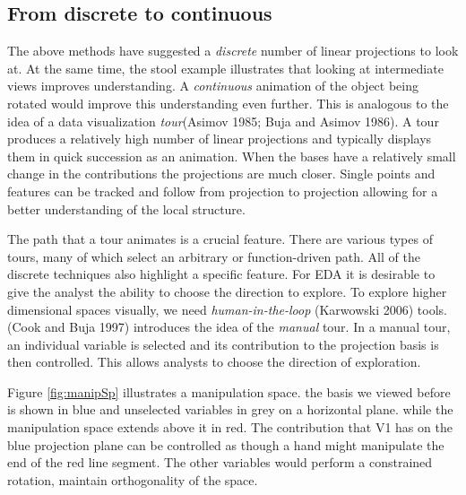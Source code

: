 \documentclass[
  11,
]{article}
\begin{document}
\hypertarget{from-discrete-to-continuous}{%
\subsection{From discrete to continuous}\label{from-discrete-to-continuous}}

The above methods have suggested a \emph{discrete} number of linear projections to look at. At the same time, the stool example illustrates that looking at intermediate views improves understanding. A \emph{continuous} animation of the object being rotated would improve this understanding even further. This is analogous to the idea of a data visualization \emph{tour}(Asimov 1985; Buja and Asimov 1986). A tour produces a relatively high number of linear projections and typically displays them in quick succession as an animation. When the bases have a relatively small change in the contributions the projections are much closer. Single points and features can be tracked and follow from projection to projection allowing for a better understanding of the local structure.

The path that a tour animates is a crucial feature. There are various types of tours, many of which select an arbitrary or function-driven path. All of the discrete techniques also highlight a specific feature. For EDA it is desirable to give the analyst the ability to choose the direction to explore. To explore higher dimensional spaces visually, we need \emph{human-in-the-loop} (Karwowski 2006) tools. (Cook and Buja 1997) introduces the idea of the \emph{manual} tour. In a manual tour, an individual variable is selected and its contribution to the projection basis is then controlled. This allows analysts to choose the direction of exploration.

Figure \ref{fig:manipSp} illustrates a manipulation space. the basis we viewed before is shown in blue and unselected variables in grey on a horizontal plane. while the manipulation space extends above it in red. The contribution that V1 has on the blue projection plane can be controlled as though a hand might manipulate the end of the red line segment. The other variables would perform a constrained rotation, maintain orthogonality of the space.
\end{document}
